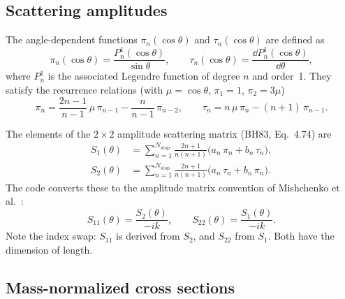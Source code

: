 \documentclass[a4paper,11pt]{article}
\begin{document}
\subsection{Scattering amplitudes}
\label{sec:scattering-amplitudes}

The angle-dependent functions $\pi_n(\cos\theta)$ and $\tau_n(\cos\theta)$
are defined as
\begin{equation}
  \pi_n(\cos\theta) = \frac{P_n^1(\cos\theta)}{\sin\theta}, \qquad
  \tau_n(\cos\theta) = \frac{\dd P_n^1(\cos\theta)}{\dd\theta},
  \label{eq:pi-tau-def}
\end{equation}
where $P_n^1$ is the associated Legendre function of degree $n$ and order~1.
They satisfy the recurrence relations (with $\mu = \cos\theta$,
$\pi_1 = 1$, $\pi_2 = 3\mu$)
\begin{equation}
  \pi_n = \frac{2n-1}{n-1}\,\mu\,\pi_{n-1} - \frac{n}{n-1}\,\pi_{n-2},
  \qquad
  \tau_n = n\,\mu\,\pi_n - (n+1)\,\pi_{n-1}.
  \label{eq:pi-tau-recurrence}
\end{equation}

The elements of the $2 \times 2$ amplitude scattering matrix (BH83, Eq.~4.74)
are
\begin{align}
  S_1(\theta) &= \sum_{n=1}^{N_\mathrm{stop}}
    \frac{2n+1}{n(n+1)}\bigl(a_n\,\pi_n + b_n\,\tau_n\bigr),
  \label{eq:s1} \\
  S_2(\theta) &= \sum_{n=1}^{N_\mathrm{stop}}
    \frac{2n+1}{n(n+1)}\bigl(a_n\,\tau_n + b_n\,\pi_n\bigr).
  \label{eq:s2}
\end{align}
The code converts these to the amplitude matrix convention of
Mishchenko et al.\ \cite{mishchenko2002}:
\begin{equation}
  S_{11}(\theta) = \frac{S_2(\theta)}{-ik}, \qquad
  S_{22}(\theta) = \frac{S_1(\theta)}{-ik}.
  \label{eq:s11-s22}
\end{equation}
Note the index swap: $S_{11}$ is derived from $S_2$, and $S_{22}$ from $S_1$.
Both have the dimension of length.

\subsection{Mass-normalized cross sections}
\label{sec:mass-cross-sections}
\end{document}
